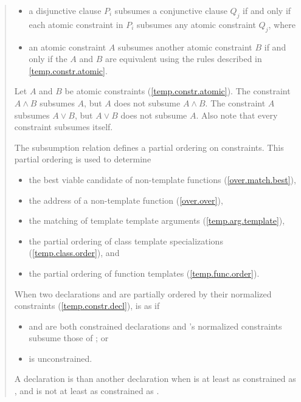 \begin{quote}
\begin{addedblock}
\begin{itemize}
\item a disjunctive clause $P_i$ subsumes a conjunctive clause
$Q_j$ if and only if each atomic constraint in $P_i$ subsumes 
any atomic constraint $Q_j$, where

\item an atomic constraint $A$ subsumes another atomic constraint
$B$ if and only if the $A$ and $B$ are equivalent using the
rules described in \ref{temp.constr.atomic}.
\end{itemize}
% 
\enterexample
Let $A$ and $B$ be atomic constraints (\ref{temp.constr.atomic}).
% 
The constraint $A \land B$ subsumes $A$, but $A$ does not subsume $A \land B$.
% 
The constraint $A$ subsumes $A \lor B$, but $A \lor B$ does not subsume $A$.
% 
Also note that every constraint subsumes itself.
\exitexample


\pnum
The subsumption relation defines a partial ordering on constraints. 
This partial ordering is used to determine
% 
\begin{itemize}
\item the best viable candidate of non-template functions
     (\ref{over.match.best}), 
\item the address of a non-template function
     (\ref{over.over}), 
\item the matching of template template arguments
     (\ref{temp.arg.template}), 
\item the partial ordering of class template specializations
     (\ref{temp.class.order}), and
\item the partial ordering of function templates
     (\ref{temp.func.order}).
\end{itemize}

\pnum
When two declarations  and  are
partially ordered by their normalized constraints (\ref{temp.constr.decl}), 
 is  as  if
% 
\begin{itemize}
\item {} and  are both constrained declarations and 
's normalized constraints subsume those of ; or

\item {} is unconstrained.
\end{itemize}

\pnum
A declaration  is 
than another declaration  when  is at least as
constrained as , and  is not at least as
constrained as .


\end{addedblock}
\end{quote}

